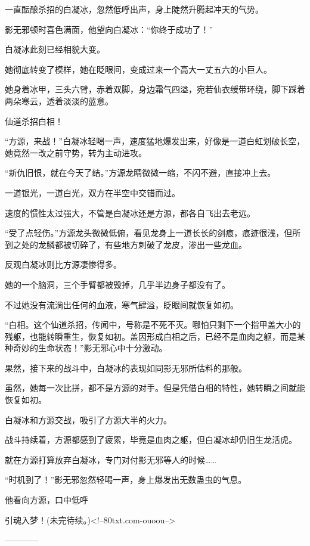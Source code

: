\begin{this_body}
一直酝酿杀招的白凝冰，忽然低呼出声，身上陡然升腾起冲天的气势。

影无邪顿时喜色满面，他望向白凝冰：“你终于成功了！”

白凝冰此刻已经相貌大变。

她彻底转变了模样，她在眨眼间，变成过来一个高大一丈五六的小巨人。

她身着冰甲，三头六臂，赤着双脚，身边霜气四溢，宛若仙衣绶带环绕，脚下踩着两朵寒云，透着淡淡的蓝意。

仙道杀招白相！

“方源，来战！”白凝冰轻喝一声，速度猛地爆发出来，好像是一道白虹划破长空，她竟然一改之前守势，转为主动进攻。

“新仇旧恨，就在今天了结。”方源龙睛微微一缩，不闪不避，直接冲上去。

一道银光，一道白光，双方在半空中交错而过。

速度的惯性太过强大，不管是白凝冰还是方源，都各自飞出去老远。

“受了点轻伤。”方源龙头微微低俯，看见龙身上一道长长的剑痕，痕迹很浅，但所到之处的龙鳞都被切碎了，有些地方刺破了龙皮，渗出一些龙血。

反观白凝冰则比方源凄惨得多。

她的一个脑洞，三个手臂都被毁掉，几乎半边身子都没有了。

不过她没有流淌出任何的血液，寒气肆溢，眨眼间就恢复如初。

“白相。这个仙道杀招，传闻中，号称是不死不灭。哪怕只剩下一个指甲盖大小的残躯，也能转瞬重生，恢复如初。盖因形成白相之后，已经不是血肉之躯，而是某种奇妙的生命状态！”影无邪心中十分激动。

果然，接下来的战斗中，白凝冰的表现如同影无邪所估料的那般。

虽然，她每一次比拼，都不是方源的对手。但是凭借白相的特性，她转瞬之间就能恢复如初。

白凝冰和方源交战，吸引了方源大半的火力。

战斗持续着，方源都感到了疲累，毕竟是血肉之躯，但白凝冰却仍旧生龙活虎。

就在方源打算放弃白凝冰，专门对付影无邪等人的时候……

“时机到了！”影无邪忽然轻喝一声，身上爆发出无数蛊虫的气息。

他看向方源，口中低呼

引魂入梦！(未完待续。)<!--80txt.com-ouoou-->

------------

\end{this_body}

